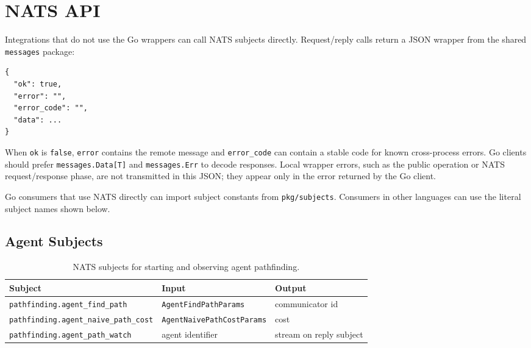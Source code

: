 \documentclass[12pt,a4paper]{report}
\begin{document}
\section{NATS API}

Integrations that do not use the Go wrappers can call NATS subjects directly.
Request/reply calls return a JSON wrapper from the shared \texttt{messages}
package:

\begin{lstlisting}
{
  "ok": true,
  "error": "",
  "error_code": "",
  "data": ...
}
\end{lstlisting}

When \texttt{ok} is \texttt{false}, \texttt{error} contains the remote message
and \texttt{error\_code} can contain a stable code for known cross-process
errors. Go clients should prefer \texttt{messages.Data[T]} and
\texttt{messages.Err} to decode responses. Local wrapper errors, such as the
public operation or NATS request/response phase, are not transmitted in this
JSON; they appear only in the error returned by the Go client.

Go consumers that use NATS directly can import subject constants from
\texttt{pkg/subjects}. Consumers in other languages can use the literal subject
names shown below.

\subsection{Agent Subjects}

\begin{table}[H]
\centering
\small
\begin{tabular}{|p{}|p{}|p{}|}
\hline
\textbf{Subject} & \textbf{Input} & \textbf{Output} \\
\hline
\texttt{pathfinding.}\newline\texttt{agent\_find\_path} &
\texttt{AgentFindPath}\newline\texttt{Params} &
communicator id \\
\hline
\texttt{pathfinding.}\newline\texttt{agent\_naive\_}\newline\texttt{path\_cost} &
\texttt{AgentNaive}\newline\texttt{PathCostParams} &
cost \\
\hline
\texttt{pathfinding.}\newline\texttt{agent\_path\_watch} &
agent identifier &
stream on reply subject \\
\hline
\end{tabular}
\caption{NATS subjects for starting and observing agent pathfinding.}
\end{table}
\end{document}
